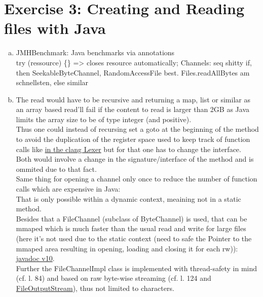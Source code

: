 \documentclass[a4paper]{article}
\begin{document}
	\section*{Exercise 3: Creating and Reading files with Java}\label{sec:exercise3}
	\begin{enumerate}[a.]
        \item JMHBenchmark: Java benchmarks via annotations \\
            try (ressource) \{\} => closes resource automatically; Channels: seq shitty if, then SeekableByteChannel, RandomAccessFile best.
            Files.readAllBytes am schnellsten, else similar
        \item The read would have to be recursive and returning a map, list or similar as an array based read'll fail if the content to read is larger than 2GB as Java limits the array size to be of type integer (and positive).\\
            Thus one could instead of recursing set a goto at the beginning of the method to avoid the duplication of the register space used to
            keep track of function calls like 
            \href{https://github.com/llvm-mirror/clang/blob/8029b38886dd239769e3501dac21438e16886ce8/lib/Lex/Lexer.cpp\#L3220}{in the clang Lexer}
            but for that one has to change the interface. \\
            Both would involve a change in the signature/interface of the method and is ommited due to that fact. \\
            Same thing for opening a channel only once to reduce the number of function calls which are expensive in Java: \\
            That is only possible within a dynamic context, meaining not in a static method. \\
            Besides that a FileChannel (subclass of ByteChannel) is used, that can be mmaped which is much faster than the usual read and write 
            for large files (here it's not used due to the static context (need to safe the Pointer to the mmaped area resulting in opening,
            loading and closing it for each rw)): \\
            \href{https://github.com/unofficial-openjdk/openjdk/blob/531ef5d0ede6d733b00c9bc1b6b3c14a0b2b3e81/src/java.base/share/classes/java/nio/channels/FileChannel.java\#L64}{javadoc v10}.\\
            Further the FileChannelImpl class is implemented with thread-safety in mind (cf. l. 84) and based on raw byte-wise streaming 
            (cf. l. 124 and 
            \href{https://github.com/unofficial-openjdk/openjdk/blob/531ef5d0ede6d733b00c9bc1b6b3c14a0b2b3e81/src/java.base/share/classes/java/io/FileOutputStream.java\#L43}{FileOutputStream}), 
            thus not limited to characters. \\


\end{enumerate}
\end{document}
